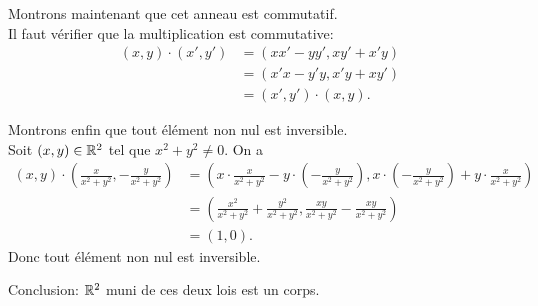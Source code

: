 {\begin{td-sol}[]
        \ptr{} Montrons maintenant que cet anneau est commutatif.\\
        Il faut vérifier que la multiplication est commutative:
        \begin{equation*}
            \begin{aligned}
                (x,y) \cdot (x',y') &= (xx'-yy',xy'+x'y)\\
                &= (x'x-y'y,x'y+xy')\\
                &= (x',y') \cdot (x,y).
            \end{aligned}
        \end{equation*}

        \ptr{} Montrons enfin que tout élément non nul est inversible.\\
        Soit \((x,y) \in \mathbb{R}^2\) tel que \(x^2+y^2 \neq 0\). On a
        \begin{equation*}
            \begin{aligned}
                (x,y) \cdot \left(\frac{x}{x^2+y^2},-\frac{y}{x^2+y^2}\right) &= \left(x\cdot \frac{x}{x^2+y^2}-y\cdot \left(-\frac{y}{x^2+y^2}\right),x\cdot \left(-\frac{y}{x^2+y^2}\right)+y\cdot \frac{x}{x^2+y^2}\right)\\
                &= \left(\frac{x^2}{x^2+y^2}+\frac{y^2}{x^2+y^2},\frac{xy}{x^2+y^2}-\frac{xy}{x^2+y^2}\right)\\
                &= \left(1,0\right).
            \end{aligned}
        \end{equation*}
        Donc tout élément non nul est inversible.

        \ptr{} Conclusion: \(\mathbb{R}^2\) muni de ces deux lois est un corps.
    \end{td-sol}
}{}

% 
